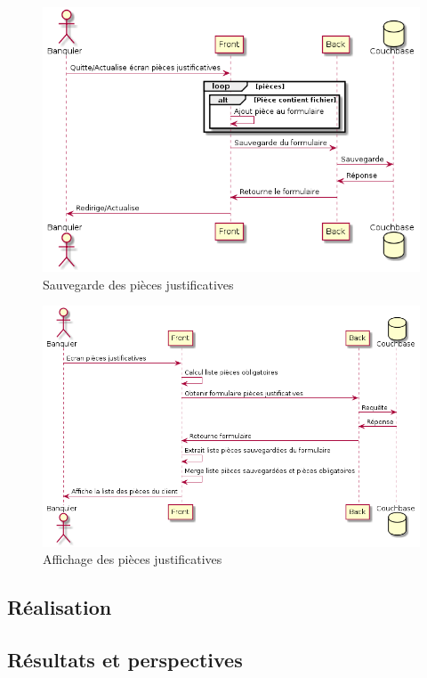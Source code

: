 \begin{figure}[h!]
	\includegraphics[scale=0.55]{images/travailBP1818/piecesJustif/seqSave.png}
	\centering
	\caption{Sauvegarde des pièces justificatives}
	\label{seqSave}
\end{figure}

\begin{figure}[h!]
	\includegraphics[scale=0.55]{images/travailBP1818/piecesJustif/seqGet.png}
	\centering
	\caption{Affichage des pièces justificatives}
	\label{seqGet}
\end{figure}

\subsection{Réalisation}

\subsection{Résultats et perspectives}
	
